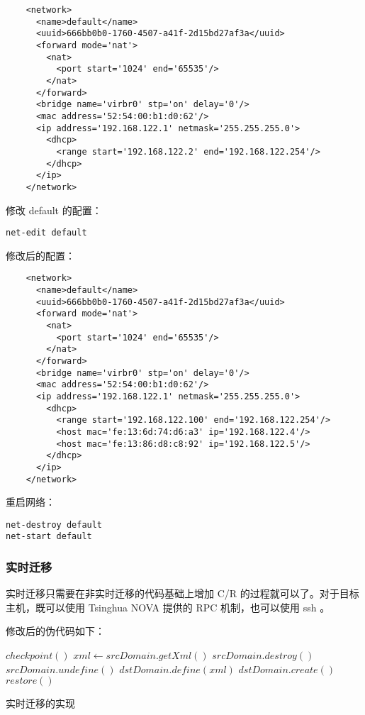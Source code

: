 \begin{lstlisting}
    <network>
      <name>default</name>
      <uuid>666bb0b0-1760-4507-a41f-2d15bd27af3a</uuid>
      <forward mode='nat'>
        <nat>
          <port start='1024' end='65535'/>
        </nat>
      </forward>
      <bridge name='virbr0' stp='on' delay='0'/>
      <mac address='52:54:00:b1:d0:62'/>
      <ip address='192.168.122.1' netmask='255.255.255.0'>
        <dhcp>
          <range start='192.168.122.2' end='192.168.122.254'/>
        </dhcp>
      </ip>
    </network>
\end{lstlisting}

修改 default 的配置：

\begin{lstlisting}
net-edit default
\end{lstlisting}

修改后的配置：

\begin{lstlisting}
    <network>
      <name>default</name>
      <uuid>666bb0b0-1760-4507-a41f-2d15bd27af3a</uuid>
      <forward mode='nat'>
        <nat>
          <port start='1024' end='65535'/>
        </nat>
      </forward>
      <bridge name='virbr0' stp='on' delay='0'/>
      <mac address='52:54:00:b1:d0:62'/>
      <ip address='192.168.122.1' netmask='255.255.255.0'>
        <dhcp>
          <range start='192.168.122.100' end='192.168.122.254'/>
          <host mac='fe:13:6d:74:d6:a3' ip='192.168.122.4'/>
          <host mac='fe:13:86:d8:c8:92' ip='192.168.122.5'/>
        </dhcp>
      </ip>
    </network>
\end{lstlisting}

重启网络：

\begin{lstlisting}
net-destroy default
net-start default
\end{lstlisting}

\subsubsection{实时迁移}

实时迁移只需要在非实时迁移的代码基础上增加 C/R 的过程就可以了。对于目标主机，既可以使用
Tsinghua NOVA 提供的 RPC 机制，也可以使用 ssh 。

修改后的伪代码如下：

\begin{algorithm}[H]
    \begin{algorithmic}
        \State $checkpoint()$
        \State $xml\gets srcDomain.getXml()$
            \State $srcDomain.destroy()$
        \EndIf
        \State $srcDomain.undefine()$
        \State $dstDomain.define(xml)$
        \State $dstDomain.create()$
        \State $restore()$
    \EndIf
    \end{algorithmic}
    \caption{实时迁移的实现}
\end{algorithm}

